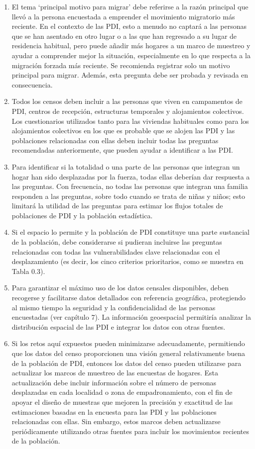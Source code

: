 \documentclass[
]{book}
\begin{document}
\begin{enumerate}
\def\labelenumi{\arabic{enumi}.}
\item
  El tema `principal motivo para migrar' debe referirse a la razón principal que llevó a la persona encuestada a emprender el movimiento migratorio más reciente. En el contexto de las PDI, esto a menudo no captará a las personas que se han asentado en otro lugar o a las que han regresado a su lugar de residencia habitual, pero puede añadir más hogares a un marco de muestreo y ayudar a comprender mejor la situación, especialmente en lo que respecta a la migración forzada más reciente. Se recomienda registrar solo un motivo principal para migrar. Además, esta pregunta debe ser probada y revisada en consecuencia.
\item
  Todos los censos deben incluir a las personas que viven en campamentos de PDI, centros de recepción, estructuras temporales y alojamientos colectivos. Los cuestionarios utilizados tanto para las viviendas habituales como para los alojamientos colectivos en los que es probable que se alojen las PDI y las poblaciones relacionadas con ellas deben incluir todas las preguntas recomendadas anteriormente, que pueden ayudar a identificar a las PDI.
\item
  Para identificar si la totalidad o una parte de las personas que integran un hogar han sido desplazadas por la fuerza, todas ellas deberían dar respuesta a las preguntas. Con frecuencia, no todas las personas que integran una familia responden a las preguntas, sobre todo cuando se trata de niñas y niños; esto limitará la utilidad de las preguntas para estimar los flujos totales de poblaciones de PDI y la población estadística.
\item
  Si el espacio lo permite y la población de PDI constituye una parte sustancial de la población, debe considerarse si pudieran incluirse las preguntas relacionadas con todas las vulnerabilidades clave relacionadas con el desplazamiento (es decir, los cinco criterios prioritarios, como se muestra en Tabla 0.3).
\item
  Para garantizar el máximo uso de los datos censales disponibles, deben recogerse y facilitarse datos detallados con referencia geográfica, protegiendo al mismo tiempo la seguridad y la confidencialidad de las personas encuestadas (ver capítulo 7). La información geoespacial permitiría analizar la distribución espacial de las PDI e integrar los datos con otras fuentes.
\item
  Si los retos aquí expuestos pueden minimizarse adecuadamente, permitiendo que los datos del censo proporcionen una visión general relativamente buena de la población de PDI, entonces los datos del censo pueden utilizarse para actualizar los marcos de muestreo de las encuestas de hogares. Esta actualización debe incluir información sobre el número de personas desplazadas en cada localidad o zona de empadronamiento, con el fin de apoyar el diseño de muestras que mejoren la precisión y exactitud de las estimaciones basadas en la encuesta para las PDI y las poblaciones relacionadas con ellas. Sin embargo, estos marcos deben actualizarse periódicamente utilizando otras fuentes para incluir los movimientos recientes de la población.


\end{enumerate}
\end{document}
